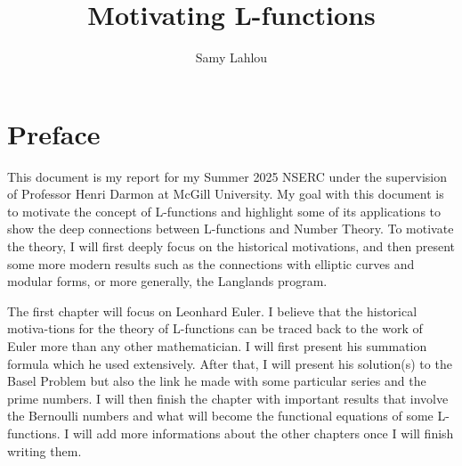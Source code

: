 \documentclass[oneside, 12pt]{book}
\title{\Huge Motivating L-functions}
\author{Samy Lahlou}
\date{}
\theoremstyle{plain}
\theoremstyle{definition}
\numberwithin{equation}{section}
\begin{document}
\maketitle 

\frontmatter

\chapter*{Preface}

This document is my report for my Summer 2025 NSERC under the supervision of Professor Henri Darmon at McGill University. My goal with this document is to motivate the concept of L-functions and highlight some of its applications to show the deep connections between L-functions and Number Theory. To motivate the theory, I will first deeply focus on the historical motivations, and then present some more modern results such as the connections with elliptic curves and modular forms, or more generally, the Langlands program.

The first chapter will focus on Leonhard Euler. I believe that the historical motiva-tions for the theory of L-functions can be traced back to the work of Euler more than any other mathematician. I will first present his summation formula which he used extensively. After that, I will present his solution(s) to the Basel Problem but also the link he made with some particular series and the prime numbers. I will then finish the chapter with important results that involve the Bernoulli numbers and what will become the functional equations of some L-functions. I will add more informations about the other chapters once I will finish writing them.
\end{document}
